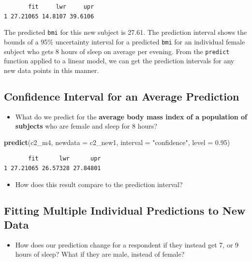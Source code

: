 \documentclass[]{book}
\newenvironment{Shaded}{\begin{snugshade}}{\end{snugshade}}
\newcommand{\KeywordTok}[1]{\textcolor[rgb]{0.13,0.29,0.53}{\textbf{#1}}}
\newcommand{\DataTypeTok}[1]{\textcolor[rgb]{0.13,0.29,0.53}{#1}}
\newcommand{\FloatTok}[1]{\textcolor[rgb]{0.00,0.00,0.81}{#1}}
\newcommand{\StringTok}[1]{\textcolor[rgb]{0.31,0.60,0.02}{#1}}
\newcommand{\NormalTok}[1]{#1}
\providecommand{\tightlist}{%
  \setlength{\itemsep}{0pt}\setlength{\parskip}{0pt}}
\theoremstyle{definition}
\theoremstyle{definition}
\theoremstyle{definition}
\theoremstyle{remark}
\begin{document}
\begin{verbatim}
       fit     lwr     upr
1 27.21065 14.8107 39.6106
\end{verbatim}

The predicted \texttt{bmi} for this new subject is 27.61. The prediction
interval shows the bounds of a 95\% uncertainty interval for a predicted
\texttt{bmi} for an individual female subject who gets 8 hours of sleep
on average per evening. From the \texttt{predict} function applied to a
linear model, we can get the prediction intervals for any new data
points in this manner.

\subsection{Confidence Interval for an Average
Prediction}\label{confidence-interval-for-an-average-prediction}

\begin{itemize}
\tightlist
\item
  What do we predict for the \textbf{average body mass index of a
  population of subjects} who are female and sleep for 8 hours?
\end{itemize}

\begin{Shaded}
\begin{Highlighting}[]
\KeywordTok{predict}\NormalTok{(c2_m4, }\DataTypeTok{newdata =}\NormalTok{ c2_new1, }\DataTypeTok{interval =} \StringTok{"confidence"}\NormalTok{, }\DataTypeTok{level =} \FloatTok{0.95}\NormalTok{)}
\end{Highlighting}
\end{Shaded}

\begin{verbatim}
       fit      lwr      upr
1 27.21065 26.57328 27.84801
\end{verbatim}

\begin{itemize}
\tightlist
\item
  How does this result compare to the prediction interval?
\end{itemize}

\subsection{Fitting Multiple Individual Predictions to New
Data}\label{fitting-multiple-individual-predictions-to-new-data}

\begin{itemize}
\tightlist
\item
  How does our prediction change for a respondent if they instead get 7,
  or 9 hours of sleep? What if they are male, instead of female?
\end{itemize}
\end{document}
